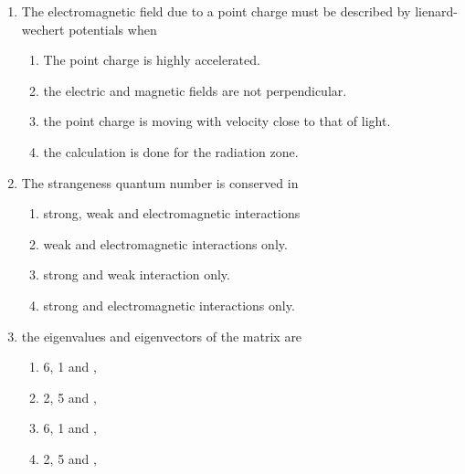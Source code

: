 \documentclass[journal,13pt,onecolumn]{IEEEtran}
\begin{document}
\begin{enumerate}[itemsep = 1em]
\item The electromagnetic field due to a point charge must be described by lienard-wechert potentials when

\hfill{}

\begin{enumerate}
    \item The point charge is highly accelerated.
    \item the electric and magnetic fields are not perpendicular.
    \item the point charge is moving with velocity close to that of light.
    \item the calculation is done for the radiation zone.
\end{enumerate}


\item The strangeness quantum number is conserved in

\hfill{}

\begin{enumerate}
    \item strong, weak and electromagnetic interactions
    \item weak and electromagnetic interactions only.
    \item strong and weak interaction only.
    \item strong and electromagnetic interactions only.
\end{enumerate}


\item the eigenvalues and eigenvectors of the matrix  are 

\hfill{}

\begin{multicols}{2}
\begin{enumerate}
    \item 6, 1 and ,
    \item 2, 5 and ,
    \item 6, 1 and ,
    \item 2, 5 and ,
    \end{enumerate}
\end{multicols}



\end{enumerate}
\end{document}
